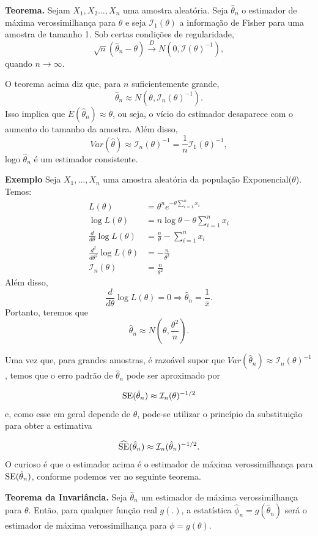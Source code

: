 \documentclass[
  letterpaper,
  DIV=11,
  numbers=noendperiod]{scrartcl}
\begin{document}
\textbf{Teorema.} Sejam \(X_1,X_2\ldots,X_n\) uma amostra aleatória.
Seja \(\hat{\theta}_n\) o estimador de máxima verossimilhança para
\(\theta\) e seja \(\mathcal{I}_{1}(\theta)\) a informação de Fisher
para uma amostra de tamanho 1. Sob certas condições de regularidade,
\[\sqrt{n}(\hat{\theta}_n-\theta)\stackrel{D}{\rightarrow}N\left(0,\mathcal{I}(\theta)^{-1}\right),\]
quando \(n\rightarrow\infty\).

O teorema acima diz que, para \(n\) suficientemente grande,
\[\hat{\theta}_n\approx N\left(\theta,\mathcal{I}_n(\theta)^{-1}\right).\]
Isso implica que \(E(\hat{\theta}_n)\approx \theta\), ou seja, o vício
do estimador desaparece com o aumento do tamanho da amostra. Além disso,
\[Var(\hat{\theta})\approx\mathcal{I}_{n}(\theta)^{-1}=\frac{1}{n}\mathcal{I}_1(\theta)^{-1},\]
logo \(\hat{\theta}_n\) é um estimador consistente.

\textbf{Exemplo} Seja \(X_1,\ldots,X_n\) uma amostra aleatória da
população Exponencial(\(\theta\)). Temos: \[\begin{align*}
L(\theta)&=\theta^ne^{-\theta\sum_{i=1}^{n}x_i}\\
\log L(\theta)&=n\log\theta - \theta \sum_{i=1}^{n}x_i \\
\frac{d}{d\theta}\log L(\theta)&= \frac{n}{\theta} - \sum_{i=1}^{n}x_i \\
\frac{d^2}{d\theta^2}\log L(\theta)&=-\frac{n}{\theta^2}\\
\mathcal{I}_n(\theta)&=\frac{n}{\theta^2} 
\end{align*}\] Além disso,
\[\frac{d}{d\theta}\log L(\theta)=0\Rightarrow \hat{\theta}_n=\frac{1}{\bar{x}}.\]
Portanto, teremos que
\[\hat{\theta}_n\approx N\left(\theta,\frac{\theta^2}{n}\right).\]

Uma vez que, para grandes amostras, é razoável supor que
\(Var(\hat{\theta}_n)\approx \mathcal{I}_n(\theta)^{-1}\), temos que o
erro padrão de \(\hat{\theta}_n\) pode ser aproximado por

\[\hbox{SE}(\hat{\theta}_n)\approx \mathcal{I}_n(\theta)^{-1/2}\] e,
como esse em geral depende de \(\theta\), pode-se utilizar o princípio
da substituição para obter a estimativa

\[\widehat{\hbox{SE}}(\hat{\theta}_n)\approx \mathcal{I}_n(\hat{\theta}_{n})^{-1/2}.\]
O curioso é que o estimador acima é o estimador de máxima
verossimilhança para \(\hbox{SE}(\hat{\theta}_n)\), conforme podemos ver
no seguinte teorema.

\textbf{Teorema da Invariância.} Seja \(\hat{\theta}_n\) um estimador de
máxima verossimilhança para \(\theta\). Então, para qualquer função real
\(g(.)\), a estatística \(\hat{\phi}_n=g(\hat{\theta}_n)\) será o
estimador de máxima verossimilhança para \(\phi=g(\theta)\).
\end{document}
